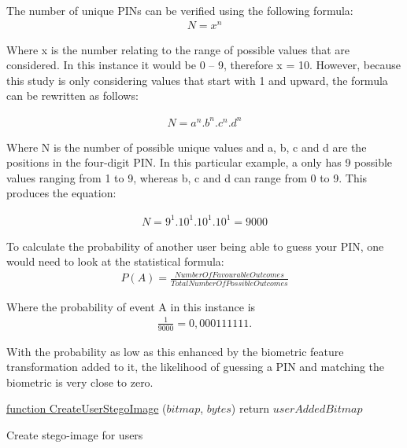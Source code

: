The number of unique PINs can be verified using the following formula:
\begin{gather}
    N =  x^{n}    
\end{gather}


Where x is the number relating to the range of possible values that are considered. In this instance it would be 0 – 9, therefore x = 10. However, because this study is only considering values that start with 1 and upward, the formula can be rewritten as follows:

\begin{gather}
    N = a^{n}.b^{n}.c^{n}.d^{n}    
\end{gather}


Where N is the number of possible unique values and a, b, c and d are the positions in the four-digit PIN. In this particular example, a only has 9 possible values ranging from 1 to 9, whereas b, c and d can range from 0 to 9. This produces the equation:

\begin{gather}
    N = 9^{1}.10^{1}.10^{1}.10^{1} 
    = 9 000    
\end{gather}



To calculate the probability of another user being able to guess your PIN, one would need to look at the statistical formula: 
\begin{gather}
    P (A) = \frac{NumberOfFavourableOutcomes}{TotalNumberOfPossibleOutcomes}
\end{gather}


Where the probability of event A in this instance is 
\begin{gather}
    \frac{1}{9 000} = 0,000111111.
\end{gather}

With the probability as low as this enhanced by the biometric feature transformation added to it, the likelihood of guessing a PIN and matching the biometric is very close to zero.


\begin{algorithm}
     \underline{function CreateUserStegoImage} ($bitmap$, $bytes$)\;
     return $userAddedBitmap$
     \caption{Create stego-image for users}
     \label{alg: Create stego-image for users}
     
\end{algorithm}

